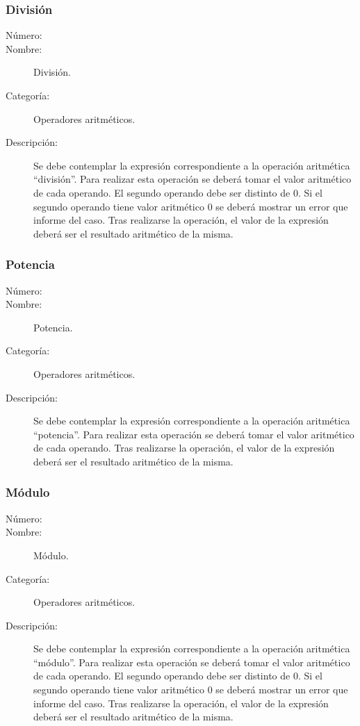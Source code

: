 \subsubsection{División}
\begin{framed}
	\begin{description}
		\item [Número:] \cn
		\item [Nombre:] División.
		\item [Categoría:] Operadores aritméticos.
		\item [Descripción:] Se debe contemplar la expresión correspondiente a la operación aritmética ``división''. Para realizar
		esta operación se deberá tomar el valor aritmético de cada operando. El segundo operando debe ser
		distinto de 0. Si el segundo operando tiene valor aritmético 0 se deberá mostrar un error que informe del caso.
		Tras realizarse la operación, el valor de la expresión
		deberá ser el resultado aritmético de la misma.
	\end {description}
\end{framed}

\subsubsection{Potencia}
\begin{framed}
	\begin{description}
		\item [Número:] \cn
		\item [Nombre:] Potencia.
		\item [Categoría:] Operadores aritméticos.
		\item [Descripción:] Se debe contemplar la expresión correspondiente a la operación aritmética ``potencia''. Para realizar
		esta operación se deberá tomar el valor aritmético de cada operando. Tras realizarse la operación, el valor de la expresión
		deberá ser el resultado aritmético de la misma.
	\end {description}
\end{framed}

\subsubsection{Módulo}
\begin{framed}
	\begin{description}
		\item [Número:] \cn
		\item [Nombre:] Módulo.
		\item [Categoría:] Operadores aritméticos.
		\item [Descripción:] Se debe contemplar la expresión correspondiente a la operación aritmética ``módulo''. Para realizar
		esta operación se deberá tomar el valor aritmético de cada operando. El segundo operando debe ser
		distinto de 0. Si el segundo operando tiene valor aritmético 0 se deberá mostrar un error que informe del caso.
		Tras realizarse la operación, el valor de la expresión deberá ser el resultado aritmético de la misma.
	\end {description}
\end{framed}

